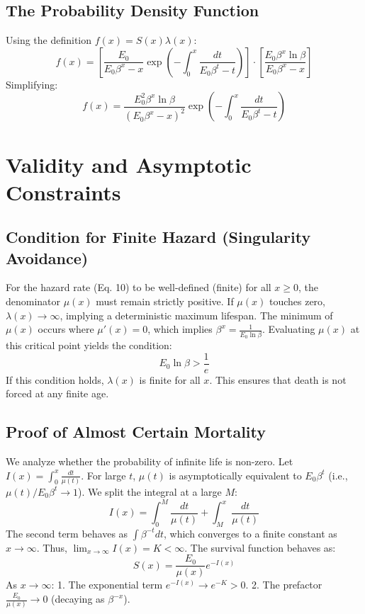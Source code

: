 \documentclass{article}
\begin{document}
	\subsection{The Probability Density Function}
	Using the definition $f(x) = S(x)\lambda(x)$:
	\begin{equation}
		f(x) = \left[ \frac{E_0}{E_0 \beta^x - x} \exp \left( - \int_0^x \frac{dt}{E_0 \beta^t - t} \right) \right] \cdot \left[ \frac{E_0 \beta^x \ln \beta}{E_0 \beta^x - x} \right]
	\end{equation}
	Simplifying:
	\begin{equation}
		f(x) = \frac{E_0^2 \beta^x \ln \beta}{(E_0 \beta^x - x)^2} \exp \left( - \int_0^x \frac{dt}{E_0 \beta^t - t} \right)
	\end{equation}
	
	\section{Validity and Asymptotic Constraints}
	
	\subsection{Condition for Finite Hazard (Singularity Avoidance)}
	For the hazard rate (Eq. 10) to be well-defined (finite) for all $x \ge 0$, the denominator $\mu(x)$ must remain strictly positive. If $\mu(x)$ touches zero, $\lambda(x) \to \infty$, implying a deterministic maximum lifespan.
	The minimum of $\mu(x)$ occurs where $\mu'(x)=0$, which implies $\beta^x = \frac{1}{E_0 \ln \beta}$.
	Evaluating $\mu(x)$ at this critical point yields the condition:
	\begin{equation}
		E_0 \ln \beta > \frac{1}{e}
	\end{equation}
	If this condition holds, $\lambda(x)$ is finite for all $x$. This ensures that death is not forced at any finite age.
	
	\subsection{Proof of Almost Certain Mortality}
	We analyze whether the probability of infinite life is non-zero.
	Let $I(x) = \int_0^x \frac{dt}{\mu(t)}$.
	For large $t$, $\mu(t)$ is asymptotically equivalent to $E_0 \beta^t$ (i.e., $\mu(t)/E_0 \beta^t \to 1$).
	We split the integral at a large $M$:
	$$ I(x) = \int_0^M \frac{dt}{\mu(t)} + \int_M^x \frac{dt}{\mu(t)} $$
	The second term behaves as $\int \beta^{-t} dt$, which converges to a finite constant as $x \to \infty$. Thus, $\lim_{x \to \infty} I(x) = K < \infty$.
	The survival function behaves as:
	$$ S(x) = \frac{E_0}{\mu(x)} e^{-I(x)} $$
	As $x \to \infty$:
	1. The exponential term $e^{-I(x)} \to e^{-K} > 0$.
	2. The prefactor $\frac{E_0}{\mu(x)} \to 0$ (decaying as $\beta^{-x}$).
	
\end{document}
